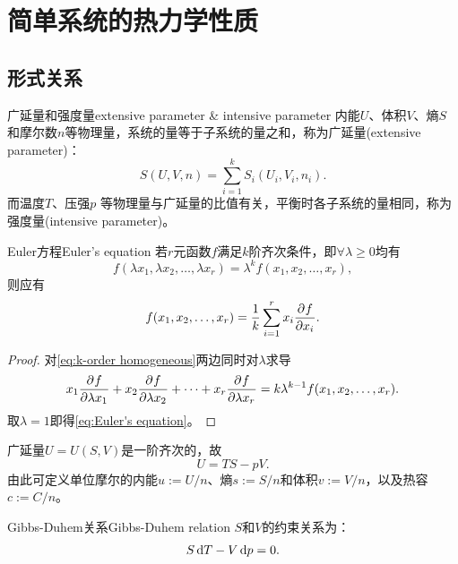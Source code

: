 \chapter{简单系统的热力学性质}
\label{chap:simple system}

\section{形式关系}

\begin{definition}
	{广延量和强度量}{extensive parameter & intensive parameter}
	内能$U$、体积$V$、熵$S$和摩尔数$n$等物理量，系统的量等于子系统的量之和，称为广延量(extensive parameter)：
	\begin{equation}
		S(U,V,n)=\sum_{i=1}^kS_i(U_i,V_i,n_i).
	\end{equation}
	而温度$T$、压强$p$%
	等物理量与广延量的比值有关，平衡时各子系统的量相同，称为强度量(intensive parameter)。
\end{definition}

\begin{theorem}
	{Euler方程}{Euler's equation}
	若$r$元函数$f$满足$k$阶齐次条件，即$\forall\lambda\geq 0$均有
	\begin{equation}
		\label{eq:k-order homogeneous}
		f(\lambda x_1,\lambda x_2,\ldots,\lambda x_r)=\lambda^k f(x_1,x_2,\ldots,x_r),
	\end{equation}
	则应有
	\begin{equation}
		\label{eq:Euler's equation}
		f(x_1,x_2,\ldots,x_r)=\frac1k\sum_{i=1}^r x_i\frac{\partial^{{}}f}{\partial{x_i}^{{}}}.
	\end{equation}
\end{theorem}

\begin{proof}
	对\eqref{eq:k-order homogeneous}两边同时对$\lambda$求导
	\[
		x_1\frac{\partial^{{}}f}{\partial{\lambda x_1}^{{}}}+x_2\frac{\partial^{{}}f}{\partial{\lambda x_2}^{{}}}+\cdots+x_r\frac{\partial^{{}}f}{\partial{\lambda x_r}^{{}}}=k\lambda^{k-1}f(x_1,x_2,\ldots,x_r).
	\]
	取$\lambda=1$即得\eqref{eq:Euler's equation}。
\end{proof}

\begin{corollary}
	广延量$U=U(S,V)$是一阶齐次的，故
	\begin{equation}
		\label{eq:U=TS-pV}
		U=TS-pV.
	\end{equation}
	由此可定义单位摩尔的内能$u:=U/n$、熵$s:=S/n$和体积$v:=V/n$，以及热容$c:=C/n$。
\end{corollary}

\begin{theorem}
	{Gibbs-Duhem关系}{Gibbs-Duhem relation}
	$S$和$V$的约束关系为：
	\begin{equation}
		S\mathop{}\!\mathrm{d} T-V\mathop{}\!\mathrm{d} p=0.
	\end{equation}
\end{theorem}

